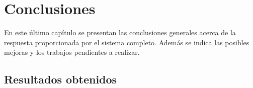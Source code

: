 
\chapter{Conclusiones} %

\label{Chapter5} %

En este último capítulo se presentan las conclusiones generales acerca de la respuesta proporcionada por el sistema completo. Además se indica las posibles mejoras y los trabajos pendientes a realizar.


\section{Resultados obtenidos}


%



